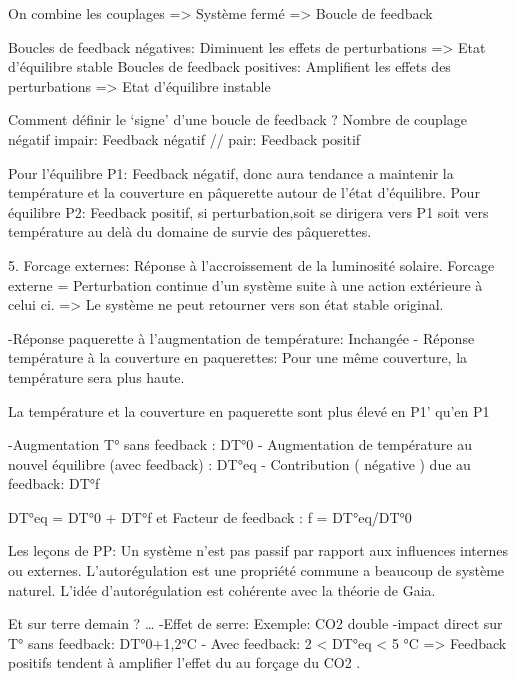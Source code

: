 On combine les couplages => Système fermé => Boucle de feedback
  



Boucles de feedback négatives: Diminuent les effets de perturbations => Etat d’équilibre stable
Boucles de feedback positives: Amplifient les effets des perturbations => Etat d’équilibre instable


Comment définir le ‘signe’ d’une boucle de feedback ?
Nombre de couplage négatif impair: Feedback négatif
//                pair: Feedback positif




Pour l’équilibre P1:
Feedback négatif, donc aura tendance a maintenir la température et la couverture en pâquerette autour de l’état d’équilibre.
Pour équilibre P2:
Feedback positif, si perturbation,soit se dirigera vers P1 soit vers température au delà du domaine de survie des pâquerettes.




5. Forcage externes: Réponse à l’accroissement de la luminosité solaire.
Forcage externe = Perturbation continue d’un système suite à une action extérieure à celui ci.
=> Le système ne peut retourner vers son état stable original.


-Réponse paquerette à l’augmentation de température: Inchangée
- Réponse température à la couverture en paquerettes:
        Pour une même couverture, la température sera plus haute.


  

La température et la couverture en paquerette sont plus élevé en P1’ qu’en P1


-Augmentation T° sans feedback : DT°0
- Augmentation de température au nouvel équilibre (avec feedback) : DT°eq 
- Contribution ( négative ) due au feedback: DT°f


DT°eq = DT°0 + DT°f et Facteur de feedback : f = DT°eq/DT°0








Les leçons de PP:
Un système n’est pas passif par rapport aux influences internes ou externes.
L’autorégulation est une propriété commune a beaucoup de système naturel.
L’idée d'autorégulation est cohérente avec la théorie de Gaia.


Et sur terre demain ? …
-Effet de serre:
Exemple: CO2 double
        -impact direct sur T° sans feedback:  DT°0+1,2°C
        - Avec feedback: 2 < DT°eq < 5 °C
        => Feedback positifs tendent à amplifier l’effet du au forçage du CO2 .


